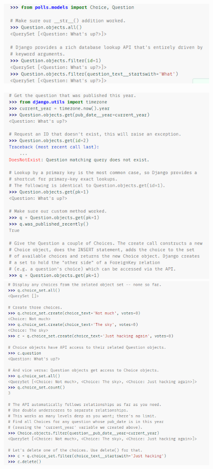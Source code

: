 \documentclass[10pt]{article}
\begin{document}
\begin{figure}[H]
\begin{center}
\includegraphics[scale=1]{figuras/324/img4.png}
\end{center}
\end{figure}
\begin{figure}[H]
\begin{center}
\includegraphics[scale=1]{figuras/324/img5.png}
\includegraphics[scale=0.9]{figuras/324/img6.png}
\end{center}
\end{figure}
\end{document}
